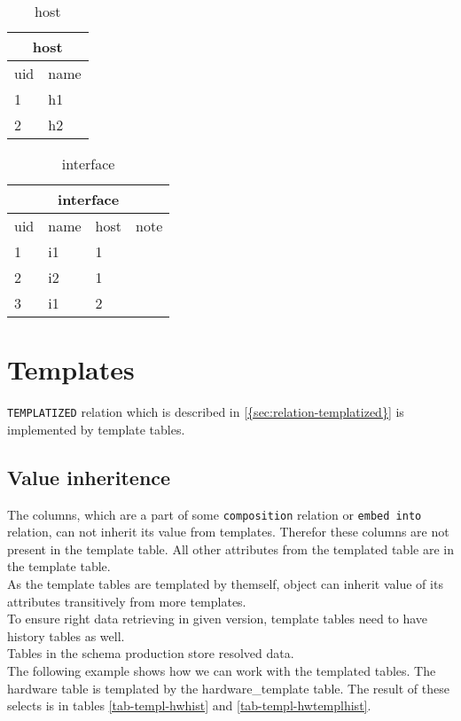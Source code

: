 \documentclass[deska]{subfiles}
\begin{document}
\begin{center}

\begin{table}
    \caption{host}
    \label{tab-embed-host}
\begin{tabular}{ | l | l | }
    \hline
    \multicolumn{2}{|c|}{host}\\
    \hline
    uid & name \\
    \hline
    1 & h1\\
    2 & h2\\
    \hline
\end{tabular}
\end{table}

\begin{table}
    \caption{interface}
    \label{tab-embed-interface}
\begin{tabular}{ | l | l | l | l | }
    \hline
    \multicolumn{4}{|c|}{interface}\\
    \hline
    uid & name & host & note\\
    \hline
    1 & i1 & 1 & \\
    2 & i2 & 1 & \\
    3 & i1 & 2 & \\
    \hline
\end{tabular}
\end{table}

\end{center}

\section{Templates}
{\tt TEMPLATIZED} relation which is described in \ref{{sec:relation-templatized}} is implemented by template tables. 

\subsection{Value inheritence}
The columns, which are a part of some {\tt composition} relation or {\tt embed into} relation, can not inherit its value from templates. Therefor these columns are not present in the template table. All other attributes from the templated table are in the template table.\\
As the template tables are templated by themself, object can inherit value of its attributes transitively from more templates.\\
To ensure right data retrieving in given version, template tables need to have history tables as well.\\
Tables in the schema production store resolved data.\\
The following example shows how we can work with the templated tables. The hardware table is templated by the hardware\_template table. The result of these selects is in tables \ref{tab-templ-hwhist} and \ref{tab-templ-hwtemplhist}.
\end{document}
